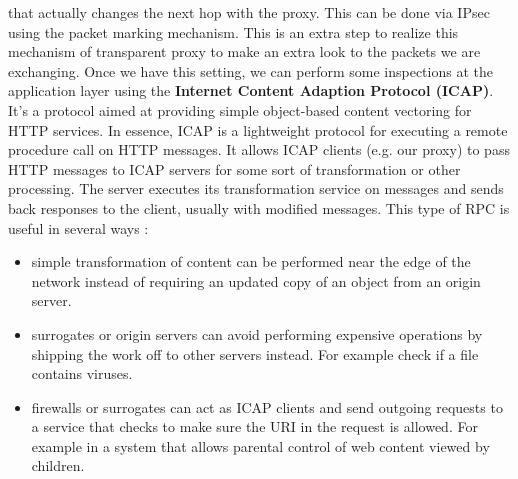 \documentclass[11pt]{article}
\begin{document}
that actually changes the next hop with the proxy. This can be done via IPsec using the packet marking mechanism. This is an extra step to realize this mechanism of transparent proxy to make an extra look to the packets we are exchanging. Once we have this setting, we can perform some inspections at the application layer using the \textbf{Internet Content Adaption Protocol (ICAP)}. It's a protocol aimed at providing simple object-based content vectoring for HTTP services. In essence, ICAP is a lightweight protocol for executing a remote procedure call on HTTP messages. It allows ICAP clients (e.g. our proxy) to pass HTTP messages to ICAP servers for some sort of transformation or other processing. The server executes its transformation service on messages and sends back responses to the client, usually with modified messages. This type of RPC is useful in several ways :
\begin{itemize}
\item simple transformation of content can be performed near the edge of the network instead of requiring an updated copy of an object from an origin server.
\item surrogates or origin servers can avoid performing expensive operations by shipping the work off to other servers instead. For example check if a file contains viruses.
\item firewalls or surrogates can act as ICAP clients and send outgoing requests to a service that checks to make sure the URI in the request is allowed. For example in a system that allows parental control of web content viewed by children.
\end{itemize}
\end{document}
